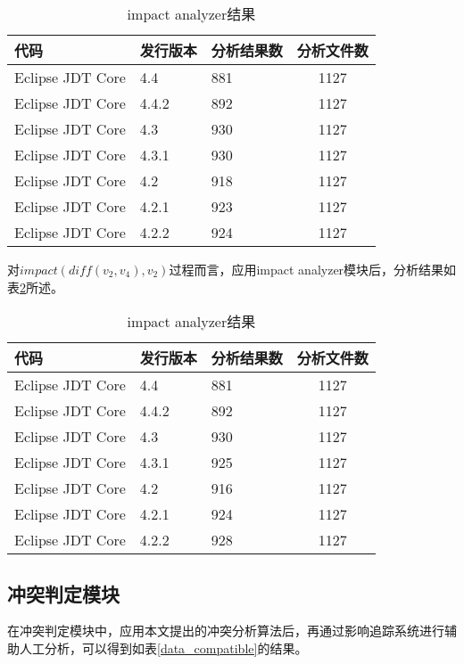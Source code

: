 \begin{table}[H]
	\caption{impact analyzer结果}
	\label{data_impact_1}
	\centering
	\begin{tabular}{lllc}
		\toprule[1.5pt]
		{\heiti 代码} & {\heiti 发行版本} & {\heiti 分析结果数} & {\heiti 分析文件数} \\\midrule[1pt]
		Eclipse JDT Core & 4.4	 & 881	& 1127\\
		Eclipse JDT Core & 4.4.2 & 892	& 1127 	\\
		Eclipse JDT Core & 4.3	 & 930	& 1127		\\
		Eclipse JDT Core & 4.3.1 & 930	& 1127 	\\
		Eclipse JDT Core & 4.2 	 &	918 & 1127		\\
		Eclipse JDT Core & 4.2.1 & 923	& 1127	\\
		Eclipse JDT Core & 4.2.2  & 924	& 1127	\\
		\bottomrule[1.5pt]
	\end{tabular}
\end{table}

对$impact(diff(v_2,v_4),v_2)$过程而言，应用impact analyzer模块后，分析结果如表\ref {data_impact_2}所述。

\begin{table}[H]
	\caption{impact analyzer结果}
	\label{data_impact_2}
	\centering
	\begin{tabular}{lllc}
		\toprule[1.5pt]
		{\heiti 代码} & {\heiti 发行版本} & {\heiti 分析结果数} & {\heiti 分析文件数} \\\midrule[1pt]
		Eclipse JDT Core & 4.4	 & 881	& 1127\\
		Eclipse JDT Core & 4.4.2 & 892	& 1127 	\\
		Eclipse JDT Core & 4.3	 & 930	& 1127		\\
		Eclipse JDT Core & 4.3.1 & 925	& 1127 	\\
		Eclipse JDT Core & 4.2 	 & 916	& 1127		\\
		Eclipse JDT Core & 4.2.1 	 & 924	& 1127	\\
		Eclipse JDT Core & 4.2.2 	 & 928	& 1127	\\
		\bottomrule[1.5pt]
	\end{tabular}
\end{table}


\subsection{冲突判定模块}

在冲突判定模块中，应用本文提出的冲突分析算法后，再通过影响追踪系统进行辅助人工分析，可以得到如表\ref {data_compatible}的结果。

